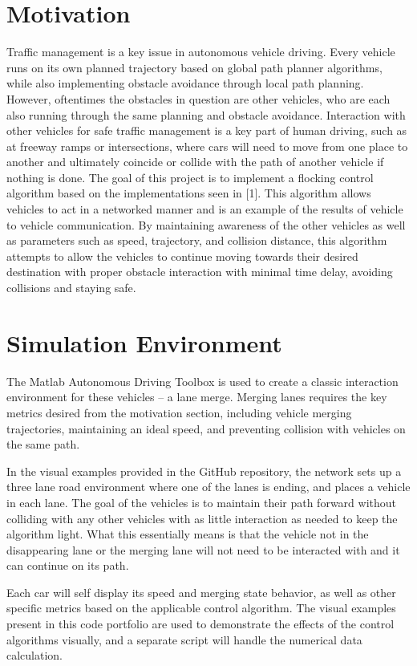 \documentclass[conference]{IEEEtran}
\begin{document}
\section{Motivation}
Traffic management is a key issue in autonomous vehicle driving. Every vehicle runs on its own planned trajectory based on global path planner algorithms, while also implementing obstacle avoidance through local path planning. However, oftentimes the obstacles in question are other vehicles, who are each also running through the same planning and obstacle avoidance. Interaction with other vehicles for safe traffic management is a key part of human driving, such as at freeway ramps or intersections, where cars will need to move from one place to another and ultimately coincide or collide with the path of another vehicle if nothing is done. The goal of this project is to implement a flocking control algorithm based on the implementations seen in [1]. This algorithm allows vehicles to act in a networked manner and is an example of the results of vehicle to vehicle communication. By maintaining awareness of the other vehicles as well as parameters such as speed, trajectory, and collision distance, this algorithm attempts to allow the vehicles to continue moving towards their desired destination with proper obstacle interaction with minimal time delay, avoiding collisions and staying safe.

\section{Simulation Environment}
The Matlab Autonomous Driving Toolbox is used to create a classic interaction environment for these vehicles – a lane merge. Merging lanes requires the key metrics desired from the motivation section, including vehicle merging trajectories, maintaining an ideal speed, and preventing collision with vehicles on the same path. 

In the visual examples provided in the GitHub repository, the network sets up a three lane road environment where one of the lanes is ending, and places a vehicle in each lane. The goal of the vehicles is to maintain their path forward without colliding with any other vehicles with as little interaction as needed to keep the algorithm light. What this essentially means is that the vehicle not in the disappearing lane or the merging lane will not need to be interacted with and it can continue on its path. 

Each car will self display its speed and merging state behavior, as well as other specific metrics based on the applicable control algorithm. The visual examples present in this code portfolio are used to demonstrate the effects of the control algorithms visually, and a separate script will handle the numerical data calculation.  
\end{document}
